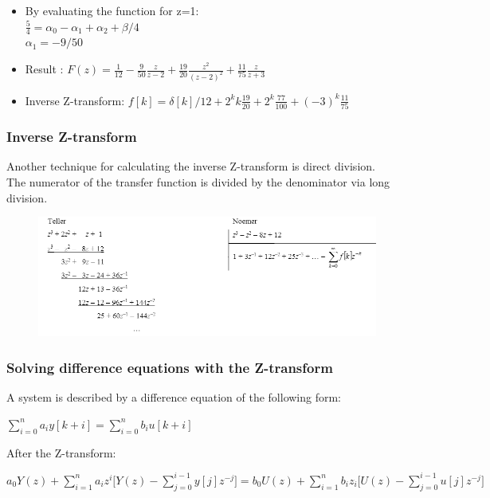 \begin{frame}
	\begin{example}
		\begin{itemize}
				\item By evaluating the function for z=1:\\
				$\frac{5}{4} = \alpha_0 - \alpha_1 + \alpha_2 + \beta/4$\\
				$\alpha_1 = -9/50$
				\item Result : $F(z) = \frac{1}{12} - \frac{9}{50} \frac{z}{z-2} + \frac{19}{20} \frac{z^2}{(z-2)^2} + \frac{11}{75} \frac{z}{z+3}$
				\item Inverse Z-transform: $f[k] = \delta[k]/12 + 2^k k \frac{19}{20}
				+ 2^k \frac{77}{100} + (-3)^k \frac{11}{75}$
		\end{itemize}
	\end{example}
\end{frame}
\begin{frame}
	\frametitle{Inverse Z-transform}
	Another technique for calculating the inverse Z-transform is direct division.\\
	The numerator of the transfer function is divided by the denominator via long division.
	\begin{figure}
		\centering
		\includegraphics[width=0.9\linewidth]{Images/discrete_time_systems_25}
		\label{fig:discrete_time_systems_25}
	\end{figure}
	
\end{frame}
\begin{frame}
	\frametitle{Solving difference equations with the Z-transform}
	A system is described by a difference equation of the following form:
	\begin{center}
		$\sum\limits_{i=0}^n a_iy[k+i] = \sum\limits_{i=0}^n b_iu[k+i]$
	\end{center}
	After the Z-transform:
	\begin{center}
		$a_0 Y(z) + \sum\limits_{i=1}^{n} a_i z^i \Bigg[Y(z)-\sum\limits_{j=0}^{i-1}y[j]z^{-j}\Bigg] = b_0U(z)+\sum\limits_{i=1}^{n} b_i z_i \Bigg[U(z)-\sum\limits_{j=0}^{i-1}u[j]z^{-j}\Bigg]$
	\end{center}

\end{frame}
